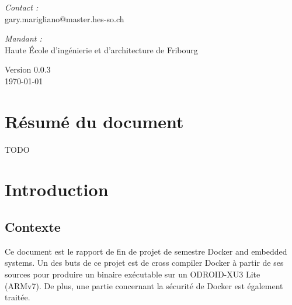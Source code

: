 \documentclass[11pt,a4paper,oneside]{report}
\newcommand{\school}{Haute École d'ingénierie et d'architecture de Fribourg}
\newcommand{\version}{0.0.3}
\newcommand{\odroid}{ODROID-XU3 Lite }
\begin{document}
\begin{titlepage}
\begin{center}
\vfill

\noindent
\begin{minipage}{0.4\textwidth}
  \begin{flushleft} \large
    \emph{Contact :}\\
    gary.marigliano@master.hes-so.ch
  \end{flushleft}
\end{minipage}%
\begin{minipage}{0.4\textwidth}
  \begin{flushright} \large
    \emph{Mandant :} \\
    \school
  \end{flushright}
\end{minipage}

\vfill

{\large Version \version \\ \today}


\end{center}
\end{titlepage}

\pagestyle{historystyle}
\begin{versionhistory}
\end{versionhistory}


\chapter{Résumé du document}

TODO

\tableofcontents
{}

\pagestyle{normal}

\chapter{Introduction}

\section{Contexte}\label{contexte}

Ce document est le rapport de fin de projet de semestre Docker and embedded systems. Un des buts de ce projet est de cross compiler Docker à partir de ses sources pour produire un binaire exécutable sur un \odroid (ARMv7). De plus, une partie concernant la sécurité de Docker est également traitée.
\end{document}

